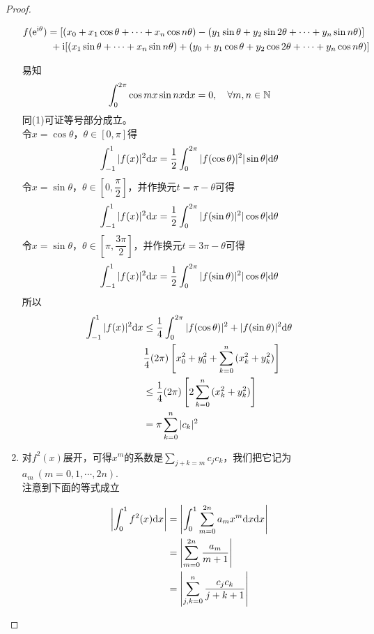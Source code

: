 \begin{proof}
\begin{enumerate}
    \begin{align*}
        f(\mathrm{e}^{\mathrm{i} \theta}) & = [(x_0 + x_1 \cos{\theta} + \cdots + x_n \cos{n\theta}) - (y_1 \sin{\theta} + y_2 \sin{2\theta} + \cdots + y_n \sin{n\theta})] \\
        & \ + \mathrm{i}[(x_1 \sin{\theta} + \cdots + x_n \sin{n\theta}) + (y_0 + y_1 \cos{\theta} + y_2 \cos{2\theta} + \cdots + y_n \cos{n\theta})]
    \end{align*}

    易知
    \[\int_{0}^{2\pi}{\cos{mx}\sin{nx}} \mathrm{d} x = 0, \quad \forall m,n \in \mathbb{N}\]
    同\textup{(1)}可证等号部分成立。 \\
    令$x = \cos{\theta}$，$\theta \in [0, \pi]$得
    \[\int_{-1}^{1}{|f(x)|^2}\mathrm{d} x = \dfrac{1}{2} \int_{0}^{2\pi}{|f(\cos{\theta})|^2|\sin{\theta}|}\mathrm{d} \theta\]
    令$x = \sin{\theta}$，$\theta \in \left[ 0, \dfrac{\pi}{2} \right]$，并作换元$t = \pi -\theta$可得
    \[\int_{-1}^{1}{|f(x)|^2}\mathrm{d} x = \dfrac{1}{2} \int_{0}^{2\pi}{|f(\sin{\theta})|^2|\cos{\theta}|}\mathrm{d} \theta\]
    令$x = \sin{\theta}$，$\theta \in \left[ \pi, \dfrac{3\pi}{2} \right]$，并作换元$t = 3\pi -\theta$可得
    \[\int_{-1}^{1}{|f(x)|^2}\mathrm{d} x = \dfrac{1}{2} \int_{0}^{2\pi}{|f(\sin{\theta})|^2|\cos{\theta}|}\mathrm{d} \theta\]
    所以
    \begin{align*}
        \int_{-1}^{1}{|f(x)|^2}\mathrm{d} x & \leq \dfrac{1}{4} \int_{0}^{2\pi}{|f(\cos{\theta})|^2 + |f(\sin{\theta})|^2} \mathrm{d} \theta \\
        & \dfrac{1}{4} (2\pi) \left[ x_0^2 + y_0^2 + \sum\limits_{k = 0}^{n}{(x_k^2 + y_k^2)} \right] \\
        & \leq \dfrac{1}{4} (2\pi) \left[ 2\sum\limits_{k = 0}^{n}{(x_k^2 + y_k^2)} \right] \\
        & = \pi \sum\limits_{k = 0}^{n}{|c_k|^2}
    \end{align*}

    \item 
        对$f^2(x)$展开，可得$x^m$的系数是$\sum\limits_{j + k = m}{c_j c_k}$，我们把它记为$a_m \ (m = 0, 1, \cdots, 2n)$. \\
        注意到下面的等式成立
        
        \begin{align*}
            \left| \int_{0}^{1}{f^2(x)}\mathrm{d} x \right| & =  \left| \int_{0}^{1}{\sum\limits_{m = 0}^{2n}{a_m x^m}}\mathrm{d} x \mathrm{d} x \right| \\
            & =  \left| \sum\limits_{m = 0}^{2n}{\dfrac{a_m}{m + 1}} \right| \\
            & =  \left| \sum\limits_{j, k = 0}^{n}{\dfrac{c_j c_k}{j + k + 1}} \right|
        \end{align*}


\end{enumerate}
\end{proof}
